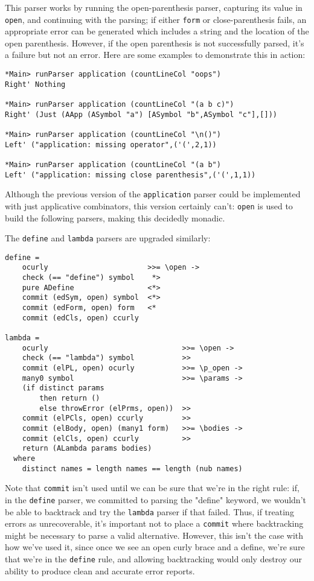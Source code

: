 \documentclass{tmr}
\begin{document}
This parser works by running the open-parenthesis parser, capturing its value in \verb+open+, and continuing
with the parsing; if either \verb+form+ or close-parenthesis fails, an appropriate error can be generated
which includes a string and the location of the open parenthesis.  However, if the open parenthesis is not
successfully parsed, it's a failure but not an error.  Here are some examples to demonstrate this in action:
\begin{verbatim}
*Main> runParser application (countLineCol "oops")
Right' Nothing

*Main> runParser application (countLineCol "(a b c)")
Right' (Just (AApp (ASymbol "a") [ASymbol "b",ASymbol "c"],[]))

*Main> runParser application (countLineCol "\n()")
Left' ("application: missing operator",('(',2,1))

*Main> runParser application (countLineCol "(a b")
Left' ("application: missing close parenthesis",('(',1,1))
\end{verbatim}
Although the previous version of the \verb+application+ parser could be implemented with just applicative combinators, 
this version certainly can't:  \verb+open+ is used to build the following parsers, making this decidedly monadic.  

The \verb+define+ and \verb+lambda+ parsers are upgraded similarly:
\begin{verbatim}
define =
    ocurly                       >>= \open ->
    check (== "define") symbol    *>
    pure ADefine                 <*>
    commit (edSym, open) symbol  <*>
    commit (edForm, open) form   <*
    commit (edCls, open) ccurly  
    
lambda =
    ocurly                               >>= \open ->
    check (== "lambda") symbol           >>
    commit (elPL, open) ocurly           >>= \p_open ->
    many0 symbol                         >>= \params ->
    (if distinct params 
        then return ()
        else throwError (elPrms, open))  >>
    commit (elPCls, open) ccurly         >>
    commit (elBody, open) (many1 form)   >>= \bodies ->
    commit (elCls, open) ccurly          >>
    return (ALambda params bodies)
  where
    distinct names = length names == length (nub names)
\end{verbatim}
Note that \verb+commit+ isn't used until we can be sure that we're in the right rule:  if, in the \verb+define+
parser, we committed to parsing the "define" keyword, we wouldn't be able to backtrack and try the \verb+lambda+
parser if that failed.  Thus, if treating errors as unrecoverable, it's important not to place a \verb+commit+
where backtracking might be necessary to parse a valid alternative.  However, this isn't the case with how
we've used it, since once we see an open curly brace and a define, we're sure that we're in the \verb+define+
rule, and allowing backtracking would only destroy our ability to produce clean and accurate error reports.
\end{document}
